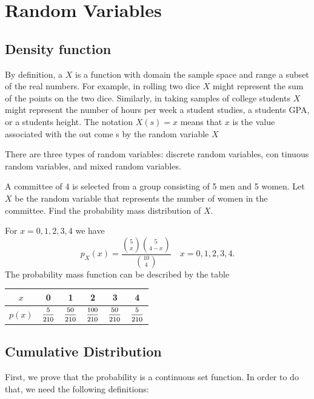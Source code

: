 \chapter{Random Variables}

\section{Density function}

By definition, a  $X$ is a function with domain the sample
 space and range a subset of the real numbers. For example, in rolling two
 dice $X$ might represent the sum of the points on the two dice. Similarly, in
 taking samples of college students $X$ might represent the number of hours
 per week a student studies, a students GPA, or a students height.
 The notation $X(s) = x$ means that $x$ is the value associated with the out
come s by the random variable $X$

There are three types of random variables: discrete random variables, con
tinuous random variables, and mixed random variables.

\begin{example}
    A committee of 4 is selected from a group consisting of 5 men and 5 women. 
    Let $X$ be the random variable that represents the number of women in the committee. 
    Find the probability mass distribution of $X$.
\end{example}
\begin{solution}
    For $x = 0, 1,2, 3, 4$ we have 
    \[
        p_X(x) = \frac{\displaystyle {5 \choose x} {5 \choose 4-x}}{\displaystyle {10 \choose 4}} \quad 
        x = 0,1,2,3,4.
    \]
    The probability mass function can be described by the table
    \begin{center}
        \begin{tabular}{c|c|c|c|c|c}
            $x$ & 0 & 1 & 2 & 3 & 4\\
            \hline
            $p(x)$ & $\mfrac{5}{210}$ & $\mfrac{50}{210}$ & $\mfrac{100}{210}$ & $\mfrac{50}{210}$ & $\mfrac{5}{210}$
        \end{tabular}
    \end{center}
\end{solution}

\section{Cumulative Distribution}
First, we prove that the probability is a continuous set function. In order to do that, we 
need the following definitions:

